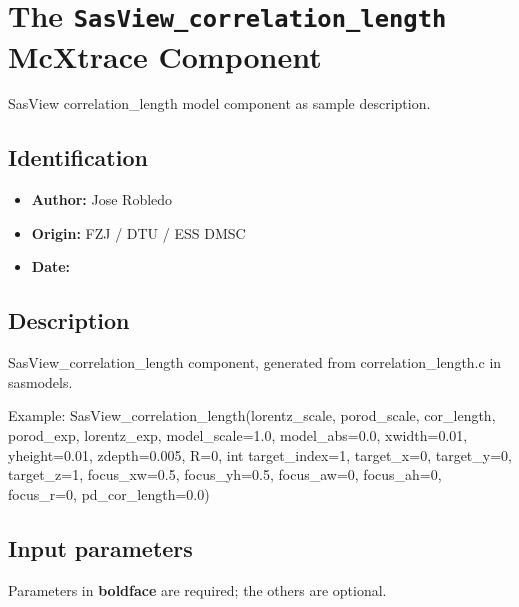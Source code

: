 \section{The \texttt{SasView\_correlation\_length} McXtrace Component}
SasView correlation\_length model component as sample description.

\subsection*{Identification}
\begin{itemize}
  \item \textbf{Author:} Jose Robledo
  \item \textbf{Origin:} FZJ / DTU / ESS DMSC
  \item \textbf{Date:} 
\end{itemize}

\subsection*{Description}
SasView\_correlation\_length component, generated from correlation\_length.c in sasmodels.

Example: SasView\_correlation\_length(lorentz\_scale, porod\_scale, cor\_length, porod\_exp, lorentz\_exp, model\_scale=1.0, model\_abs=0.0, xwidth=0.01, yheight=0.01, zdepth=0.005, R=0, int target\_index=1, target\_x=0, target\_y=0, target\_z=1, focus\_xw=0.5, focus\_yh=0.5, focus\_aw=0, focus\_ah=0, focus\_r=0, pd\_cor\_length=0.0)

\subsection*{Input parameters}
Parameters in \textbf{boldface} are required; the others are optional.

